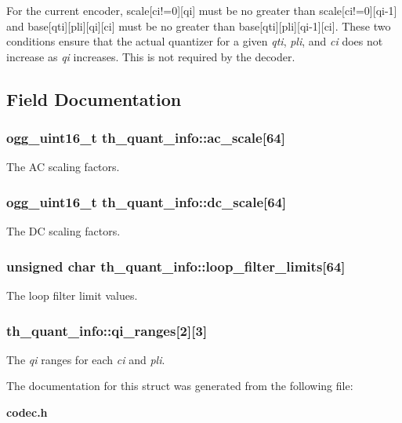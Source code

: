 For the current encoder, {\ttfamily scale[ci!=0][qi]} must be no greater than {\ttfamily scale[ci!=0][qi-\/1]} and {\ttfamily base[qti][pli][qi][ci]} must be no greater than {\ttfamily base[qti][pli][qi-\/1][ci]}. These two conditions ensure that the actual quantizer for a given {\itshape qti\/}, {\itshape pli\/}, and {\itshape ci\/} does not increase as {\itshape qi\/} increases. This is not required by the decoder. 

\subsection{Field Documentation}
\subsubsection[{ac\_\-scale}]{\setlength{\rightskip}{0pt plus 5cm}ogg\_\-uint16\_\-t {\bf th\_\-quant\_\-info::ac\_\-scale}[64]}\label{structth__quant__info_a102f079c8f4a135dc0895c10768aeb06}


The AC scaling factors. 
\subsubsection[{dc\_\-scale}]{\setlength{\rightskip}{0pt plus 5cm}ogg\_\-uint16\_\-t {\bf th\_\-quant\_\-info::dc\_\-scale}[64]}\label{structth__quant__info_ad5c1c0d1aa4127fcf864ae747d732ed9}


The DC scaling factors. 
\subsubsection[{loop\_\-filter\_\-limits}]{\setlength{\rightskip}{0pt plus 5cm}unsigned char {\bf th\_\-quant\_\-info::loop\_\-filter\_\-limits}[64]}\label{structth__quant__info_a4ac56bf0a45b5743b36daf85d5cd9e33}


The loop filter limit values. 
\subsubsection[{qi\_\-ranges}]{ {\bf th\_\-quant\_\-info::qi\_\-ranges}[2][3]}\label{structth__quant__info_a6feacf4b365e305a7df7b93d87ee7bb8}


The {\itshape qi\/} ranges for each {\itshape ci\/} and {\itshape pli\/}. 

The documentation for this struct was generated from the following file:\begin{DoxyCompactItemize}
\item 
{\bf codec.h}\end{DoxyCompactItemize}
